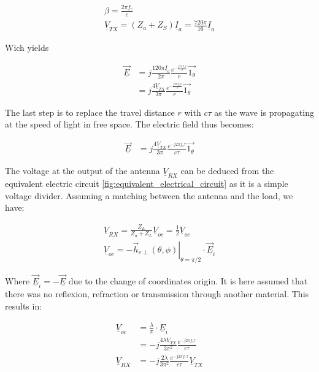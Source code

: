 \documentclass[10pt,a4paper]{ULBreport}
\begin{document}
\begin{gather*}
    \beta = \frac{2\pi f_c}{c}\\
    \underline{V}_{TX} = (Z_a + Z_S) \underline{I}_a = \frac{720\pi}{16} \underline{I}_a
\end{gather*}

Wich yields

\begin{align*}
    \underline{\vec{E}} &= j \frac{120\pi\underline{I}_a}{2\pi} \frac{e^{-\frac{j2\pi f_c r}{c}}}{r} \vec{1_{\theta}}\\
    &= j \frac{4\underline{V}_{TX}}{3\pi} \frac{e^{-\frac{j2\pi f_c r}{c}}}{r} \vec{1_{\theta}}
\end{align*}

The last step is to replace the travel distance $r$ with $c \tau$ as the wave is propagating at the speed of light in free space. The electric field thus becomes:

\begin{align*}
    \underline{\vec{E}} &= j \frac{4 \underline{V}_{TX}}{3\pi} \frac{e^{-j2\pi f_c \tau}}{c\tau} \vec{1_{\theta}}
\end{align*}

The voltage at the output of the antenna $\underline{V}_{RX}$ can be deduced from the equivalent electric circuit \ref{fig:equivalent_electrical_circuit} as it is a simple voltage divider. Assuming a matching between the antenna and the load, we have:

\begin{align*}
    \underline{V}_{RX} = \frac{Z_L}{Z_a + Z_L} \underline{V}_{oc} = \frac{1}{2} \underline{V}_{oc}\\
    \underline{V}_{oc} = -\left . \vec{h}_{e\perp}(\theta, \phi)\right\vert_{\theta = \pi/2} \cdot \underline{\vec{E}}_i
\end{align*}

Where $\underline{\vec{E}}_i = - \underline{\vec{E}}$ due to the change of coordinates origin. It is here assumed that there was no reflexion, refraction or transmission through another material. This results in:

\begin{align*}
    \underline{V}_{oc} &= \frac{\lambda}{\pi} \cdot \underline{E}_i\\
    &= -j\frac{4  \lambda \underline{V}_{TX}}{3\pi^2}\frac{e^{-j 2\pi f_c \tau}}{c\tau}\\
    \underline{V}_{RX} &= -j\frac{2  \lambda }{3\pi^2}\frac{e^{-j 2\pi f_c \tau}}{c\tau}\underline{V}_{TX}
\end{align*}
\end{document}
